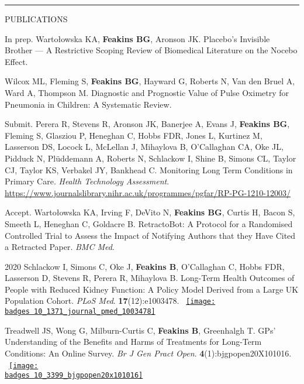 \documentclass[10pt,a4paper]{article}
\def\badges{./badges/}
\begin{document}
\noindent\rule{\textwidth}{0.4pt}
\begin{cvlist}{PUBLICATIONS}
	
	\item[In prep.]
	Warto\l{}owska KA, \textbf{Feakins BG}, Aronson JK. Placebo’s Invisible Brother --- A Restrictive Scoping Review of Biomedical Literature on the Nocebo Effect.
	
	\item[]
	Wilcox ML, Fleming S, \textbf{Feakins BG}, Hayward G, Roberts N, Van den Bruel A, Ward A, Thompson M. Diagnostic and Prognostic Value of Pulse Oximetry for Pneumonia in Children: A Systematic Review.
	
	\item[Submit.]
	Perera R, Stevens R, Aronson JK, Banerjee A, Evans J, \textbf{Feakins BG}, Fleming S, Glasziou P, Heneghan C, Hobbs FDR, Jones L, Kurtinez M, Lasserson DS, Locock L, McLellan J, Mihaylova B, O'Callaghan CA, Oke JL, Pidduck N, Pl\"uddemann A, Roberts N, Schlackow I, Shine B, Simons CL, Taylor CJ, Taylor KS, Verbakel JY, Bankhead C. Monitoring Long Term Conditions in Primary Care. \textit{Health Technology Assessment}. \url{https://www.journalslibrary.nihr.ac.uk/programmes/pgfar/RP-PG-1210-12003/}
	
	\item[Accept.]
	Warto\l{}owska KA, Irving F, DeVito N, \textbf{Feakins BG}, Curtis H, Bacon S, Smeeth L, Heneghan C, Goldacre B. RetractoBot: A Protocol for a Randomised Controlled Trial to Assess the Impact of Notifying Authors that they Have Cited a Retracted Paper. \textit{BMC Med}. 
	
	\item[2020]
	Schlackow I, Simons C, Oke J, \textbf{Feakins B}, O'Callaghan C, Hobbs FDR, Lasserson D, Stevens R, Perera R, Mihaylova B. Long-Term Health Outcomes of People with Reduced Kidney Function: A Policy Model Derived from a Large UK Population Cohort. \textit{PLoS Med}. \textbf{17}(12):e1003478. ~\href{http://www.altmetric.com/details.php?citation_id=96156539}{\texttt{[image: \\badges 10\_1371\_journal\_pmed\_1003478]}}
	
	\item[]
	Treadwell JS, Wong G, Milburn-Curtis C, \textbf{Feakins B}, Greenhalgh T. GPs' Understanding of the Benefits and Harms of Treatments for Long-Term Conditions: An Online Survey. \textit{Br J Gen Pract Open}. \textbf{4}(1):bjgpopen20X101016. ~\href{https://www.altmetric.com/details/77018222}{\texttt{[image: \\badges 10\_3399\_bjgpopen20x101016]}}
	

\end{cvlist}
\end{document}
